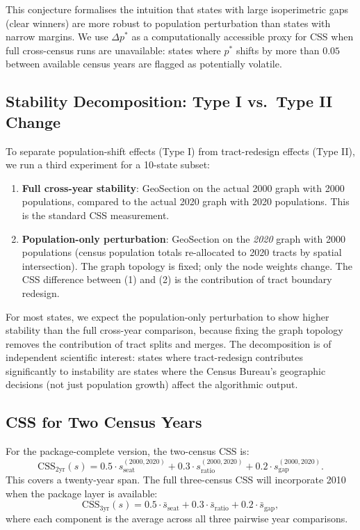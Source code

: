 This conjecture formalises the intuition that states with large isoperimetric
gaps (clear winners) are more robust to population perturbation than states
with narrow margins.
We use $\Delta p^*$ as a computationally accessible proxy for CSS when
full cross-census runs are unavailable: states where $p^*$ shifts by more
than $0.05$ between available census years are flagged as potentially volatile.

\subsection{Stability Decomposition: Type I vs.\ Type II Change}
\label{sec:decomposition}

To separate population-shift effects (Type I) from tract-redesign effects
(Type II), we run a third experiment for a 10-state subset:

\begin{enumerate}
\item \textbf{Full cross-year stability}: GeoSection on the actual 2000 graph
  with 2000 populations, compared to the actual 2020 graph with 2020
  populations.
  This is the standard CSS measurement.

\item \textbf{Population-only perturbation}: GeoSection on the \emph{2020}
  graph with 2000 populations (census population totals re-allocated to
  2020 tracts by spatial intersection).
  The graph topology is fixed; only the node weights change.
  The CSS difference between (1) and (2) is the contribution of tract
  boundary redesign.
\end{enumerate}

For most states, we expect the population-only perturbation to show higher
stability than the full cross-year comparison, because fixing the graph
topology removes the contribution of tract splits and merges.
The decomposition is of independent scientific interest: states where
tract-redesign contributes significantly to instability are states where
the Census Bureau's geographic decisions (not just population growth) affect
the algorithmic output.

\subsection{CSS for Two Census Years}
\label{sec:two-year-css}

For the package-complete version, the two-census CSS is:
\[
  \mathrm{CSS}_{2\text{yr}}(s) = 0.5 \cdot s_{\text{seat}}^{(2000,2020)}
                                + 0.3 \cdot s_{\text{ratio}}^{(2000,2020)}
                                + 0.2 \cdot s_{\text{gap}}^{(2000,2020)}.
\]
This covers a twenty-year span.
The full three-census CSS will incorporate 2010 when the package layer is
available:
\[
  \mathrm{CSS}_{3\text{yr}}(s) = 0.5 \cdot \bar{s}_{\text{seat}}
                                + 0.3 \cdot \bar{s}_{\text{ratio}}
                                + 0.2 \cdot \bar{s}_{\text{gap}},
\]
where each component is the average across all three pairwise year comparisons.

